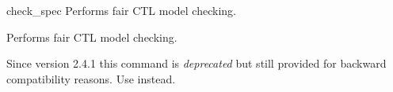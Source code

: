 \begin{nusmvCommand}{check\_spec} {Performs fair CTL model checking.}


Performs fair CTL model checking.  

Since version 2.4.1 this command is \emph{deprecated} but still
provided for backward compatibility reasons. Use
 instead.

\end{nusmvCommand}
